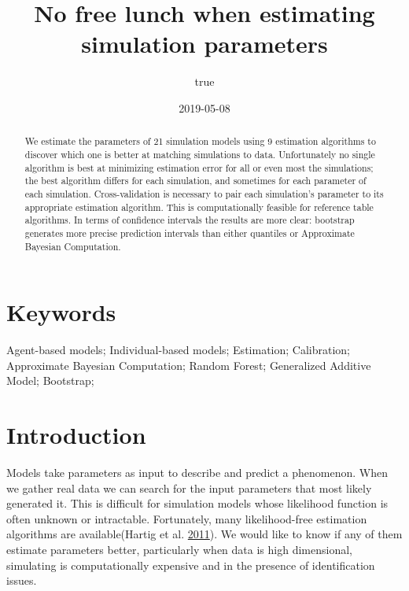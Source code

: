 \documentclass[]{article}
\title{No free lunch when estimating simulation parameters}
\author{true}
\date{2019-05-08}
\begin{document}
\maketitle
\begin{abstract}
We estimate the parameters of 21 simulation models using 9 estimation algorithms to discover which one is better at matching simulations to data. Unfortunately no single algorithm is best at minimizing estimation error for all or even most the simulations; the best algorithm differs for each simulation, and sometimes for each parameter of each simulation. Cross-validation is necessary to pair each simulation's parameter to its appropriate estimation algorithm. This is computationally feasible for reference table algorithms. In terms of confidence intervals the results are more clear: bootstrap generates more precise prediction intervals than either quantiles or Approximate Bayesian Computation.
\end{abstract}

{
\hypersetup{linkcolor=black}
\setcounter{tocdepth}{2}
\tableofcontents
}
\hypertarget{keywords}{%
\section*{Keywords}\label{keywords}}

Agent-based models;
Individual-based models;
Estimation;
Calibration;
Approximate Bayesian Computation;
Random Forest;
Generalized Additive Model;
Bootstrap;

\hypertarget{introduction}{%
\section{Introduction}\label{introduction}}

Models take parameters as input to describe and predict a phenomenon.
When we gather real data we can search for the input parameters that most likely generated it.
This is difficult for simulation models whose likelihood function is often unknown or intractable.
Fortunately, many likelihood-free estimation algorithms are available(Hartig et al. \protect\hyperlink{ref-hartig_statistical_2011}{2011}).
We would like to know if any of them estimate parameters better, particularly when data is high dimensional, simulating is computationally expensive and in the presence of identification issues.
\end{document}
